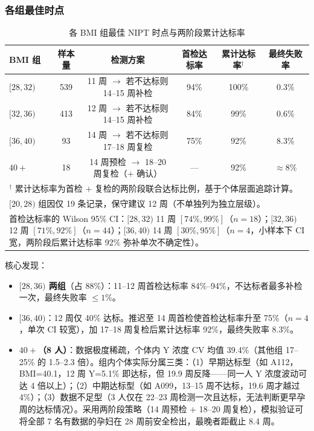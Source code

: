 \documentclass{mcm-paper}
\begin{document}
\subsubsection{各组最佳时点}

\begin{table}[H]
\centering
\caption{各 BMI 组最佳 NIPT 时点与两阶段累计达标率}
\label{tab:timing}
\begin{tabular}{lccccc}
\toprule
BMI 组 & 样本量 & 检测方案 & 首检达标率 & 累计达标率$^{\dag}$ & 最终失败率 \\
\midrule
$[28,32)$  & 539 & 11 周 $\to$ 若不达标则 14--15 周补检 & 94\%  & 100\% & 0.3\% \\
$[32,36)$ & 413 & 12 周 $\to$ 若不达标则 14--15 周补检 & 84\%  & 99\%  & 0.6\% \\
$[36,40)$ & 93  & 14 周 $\to$ 若不达标则 17--18 周复检 & 75\%  & 92\%  & 8.3\% \\
$40+$     & 18  & 14 周预检 $\to$ 18--20 周复检（$+$ 确认） & —    & 92\%  & $\approx 8\%$ \\
\bottomrule
\multicolumn{6}{p{13.5cm}}{\footnotesize $^{\dag}$ 累计达标率为首检 $+$ 复检的两阶段联合达标比例，基于个体层面追踪计算。} \\
\multicolumn{6}{p{13.5cm}}{\footnotesize $[20,28)$ 组因仅 19 条记录，保守建议 12 周（不单独列为独立层级）。} \\
\multicolumn{6}{p{13.5cm}}{\footnotesize 首检达标率的 Wilson 95\% CI：$[28,32)$ 11 周 $[74\%,99\%]$（$n=18$）；$[32,36)$ 12 周 $[71\%,92\%]$（$n=44$）；$[36,40)$ 14 周 $[30\%,95\%]$（$n=4$，小样本下 CI 宽，两阶段后累计达标率 92\% 弥补单次不确定性）。}
\end{tabular}
\end{table}

核心发现：
\begin{itemize}
    \item \textbf{$[28,36)$ 两组}（占 88\%）：11--12 周首检达标率 84\%--94\%，不达标者最多补检一次，最终失败率 $\leq 1\%$。
    \item \textbf{$[36,40)$}：12 周仅 40\% 达标。推迟至 14 周首检使首检达标率升至 75\%（$n=4$，单次 CI 较宽），加 17--18 周复检后累计达标率 92\%，最终失败率 8.3\%。
    \item \textbf{$40+$（8 人）}：数据极度稀疏，个体内 Y 浓度 CV 均值 39.4\%（其他组 17--25\% 的 1.5--2.3 倍）。组内个体实际分属三类：（1）早期达标型（如 A112，BMI=40.1，12 周 Y=5.1\% 即达标，但 19.9 周反降——同一人 Y 浓度波动可达 4 倍以上）；（2）中期达标型（如 A099，13--15 周不达标，19.6 周才越过 4\%）；（3）数据不足型（3 人仅在 22--23 周检测一次且达标，无法判断更早孕周的达标情况）。采用两阶段策略（14 周预检 $+$ 18--20 周复检），模拟验证可将全部 7 名有数据的孕妇在 28 周前安全检出，最晚者距截止 8.4 周。
\end{itemize}
\end{document}

